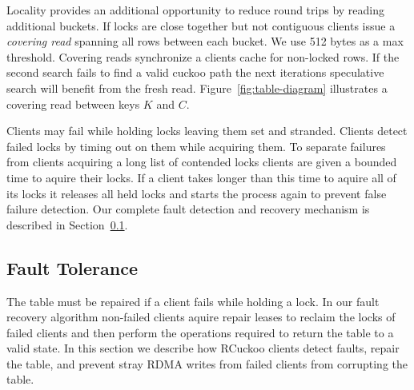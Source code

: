 Locality provides an additional opportunity to reduce round
trips by reading additional buckets. If locks are close
together but not contiguous clients issue a \textit{covering
read} spanning all rows between each bucket. We use 512
bytes as a max threshold. Covering reads synchronize a
clients cache for non-locked rows. If the second search
fails to find a valid cuckoo path the next iterations
speculative search will benefit from the fresh read.
Figure~\ref{fig:table-diagram} illustrates a covering read
between keys $K$ and $C$.


Clients may fail while holding locks leaving them set and
stranded. Clients detect failed locks by timing out on them
while acquiring them. To separate failures from clients
acquiring a long list of contended locks clients are given a
bounded time to aquire their locks. If a client takes longer
than this time to aquire all of its locks it releases all
held locks and starts the process again to prevent false
failure detection. Our complete fault detection and recovery
mechanism is described in Section~\ref{sec:fault-tolerance}.

\subsection{Fault Tolerance}
\label{sec:fault-tolerance}

The table must be repaired if a client fails while holding a
lock. In our fault recovery algorithm non-failed clients
aquire repair leases to reclaim the locks of failed clients
and then perform the operations required to return the table
to a valid state. In this section we describe how RCuckoo
clients detect faults, repair the table, and prevent stray
RDMA writes from failed clients from corrupting the table.


